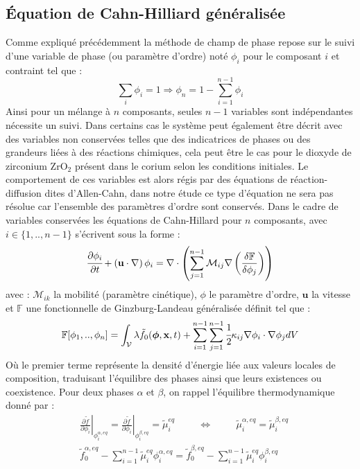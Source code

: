 \subsection{Équation de Cahn-Hilliard généralisée}
Comme expliqué précédemment la méthode de champ de phase repose sur le suivi d'une variable de phase (ou paramètre d'ordre) noté $\phi_i$ pour le composant $i$ et contraint tel que : 
\begin{equation}
\sum_i \phi_i =1 \Rightarrow \phi_n =1 - \sum_{i=1}^{n-1} \phi_i
\end{equation} 
Ainsi pour un mélange à $n$ composants, seules $n-1$ variables sont indépendantes nécessite un suivi. Dans certains cas le système peut également être décrit avec des variables non conservées telles que des indicatrices de phases ou des grandeurs liées à des réactions chimiques, cela peut être le cas pour le dioxyde de zirconium ZrO$_2$ présent dans le corium selon les conditions initiales. Le comportement de ces variables est alors régis par des équations de réaction-diffusion dites d'Allen-Cahn, dans notre étude ce type d'équation ne sera pas résolue car l'ensemble des paramètres d'ordre sont conservés. Dans le cadre de variables conservées les équations de Cahn-Hillard pour $n$ composants, avec $i\in \{1,..,n-1 \}$ s'écrivent sous la forme :
\begin{equation}
	\cfrac{\partial \phi_i}{\partial t} + \left(\mathbf{u} \cdot \nabla\right) \phi_i =  \nabla \cdot \left(\sum_{j=1}^{n-1}{\mathcal{M}_{ij}} \nabla\left( \frac{\delta \mathbb{F}}{\delta \phi_j}\right) \right) 
\end{equation}
avec : $\mathcal{M}_{ik}$ la mobilité (paramètre cinétique),  $\phi$ le paramètre d'ordre, $\mathbf{u}$ la vitesse et $\mathbb{F}$ une fonctionnelle de Ginzburg-Landeau généralisée \cite{cardon_modelisation_2016} définit tel que : 
 \begin{equation}
\mathbb{F}[\phi_1,..,\phi_n] = \int_{\mathcal{V}}\lambda\tilde{f}_0(\bm{\phi},\mathbf{x},t)+ \sum_{i=1}^{n-1}\sum_{j=1}^{n-1}\cfrac{1}{2}\kappa_{ij}\nabla \phi_i \cdot \nabla \phi_j dV
\end{equation}
Où le premier terme représente la densité d'énergie liée aux valeurs locales de composition, traduisant l'équilibre des phases ainsi que leurs existences ou coexistence. Pour deux phases $\alpha$ et $\beta$, on rappel l'équilibre thermodynamique donné par :
\begin{subequations}
	\begin{align}
		&\left.\frac{\partial \tilde{f}}{\partial \phi_i}\right|_{\phi_i^{\alpha,eq}} = \left.\frac{\partial \tilde{f}}{\partial \phi_i}\right|_{\phi_i^{\beta,eq}} = \tilde{\mu}_i^{eq} \hspace{1cm} \Leftrightarrow   \hspace{1cm} \tilde{\mu}_i^{\alpha,eq} = \tilde{\mu}_i^{\beta,eq} \\
		& 		\tilde{f}_0^{\alpha,eq} - \sum_{i=1}^{n-1}\tilde{\mu}_i^{eq}\phi_i^{\alpha,eq} = 	\tilde{f}_0^{\beta,eq} - \sum_{i=1}^{n-1}\tilde{\mu}_i^{eq}\phi_i^{\beta,eq}
	\end{align} 
\end{subequations}
